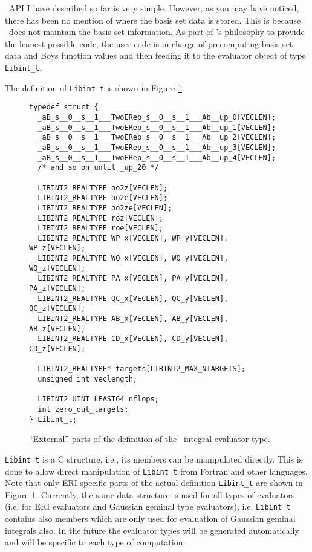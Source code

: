 \documentclass[12pt]{article}
\begin{document}
\LIBINT\ API I have described so far is very simple. However, as you may have noticed, there has been no mention of
where the basis set data is stored. This is because \LIBINT\ does not maintain the basis set information.
As part of \LIBINT 's philosophy to provide the leanest possible code, the user code
is in charge of precomputing basis set data and Boys function values and then feeding it to the evaluator object
of type {\tt Libint\_t}.

The definition of {\tt Libint\_t} is shown in Figure \ref{fig:libintt}.
\begin{figure}
\caption{\label{fig:libintt} ``External'' parts of the definition of the \LIBINT\ integral evaluator type. }
\begin{center}
\begin{minipage}[t]{0.9\linewidth}
\begin{verbatim}
typedef struct {
  _aB_s__0__s__1___TwoERep_s__0__s__1___Ab__up_0[VECLEN];
  _aB_s__0__s__1___TwoERep_s__0__s__1___Ab__up_1[VECLEN];
  _aB_s__0__s__1___TwoERep_s__0__s__1___Ab__up_2[VECLEN];
  _aB_s__0__s__1___TwoERep_s__0__s__1___Ab__up_3[VECLEN];
  _aB_s__0__s__1___TwoERep_s__0__s__1___Ab__up_4[VECLEN];
  /* and so on until _up_20 */

  LIBINT2_REALTYPE oo2z[VECLEN];
  LIBINT2_REALTYPE oo2e[VECLEN];
  LIBINT2_REALTYPE oo2ze[VECLEN];
  LIBINT2_REALTYPE roz[VECLEN];
  LIBINT2_REALTYPE roe[VECLEN];
  LIBINT2_REALTYPE WP_x[VECLEN], WP_y[VECLEN], WP_z[VECLEN];
  LIBINT2_REALTYPE WQ_x[VECLEN], WQ_y[VECLEN], WQ_z[VECLEN];
  LIBINT2_REALTYPE PA_x[VECLEN], PA_y[VECLEN], PA_z[VECLEN];
  LIBINT2_REALTYPE QC_x[VECLEN], QC_y[VECLEN], QC_z[VECLEN];
  LIBINT2_REALTYPE AB_x[VECLEN], AB_y[VECLEN], AB_z[VECLEN];
  LIBINT2_REALTYPE CD_x[VECLEN], CD_y[VECLEN], CD_z[VECLEN];
  
  LIBINT2_REALTYPE* targets[LIBINT2_MAX_NTARGETS];
  unsigned int veclength;

  LIBINT2_UINT_LEAST64 nflops;
  int zero_out_targets;
} Libint_t;
\end{verbatim}
\end{minipage}
\end{center}
\end{figure}
{\tt Libint\_t} is a C structure, i.e., its members can be manipulated directly.
This is done to allow direct manipulation of {\tt Libint\_t} from
Fortran and other languages.
Note that only ERI-specific parts of the actual definition {\tt Libint\_t} are shown in Figure \ref{fig:libintt}.
Currently, the same data structure is used for all types of evaluators (i.e. for ERI evaluators
and Gaussian geminal type evaluators), i.e. {\tt Libint\_t} contains also members which are only used
for evaluation of Gaussian geminal integrals also. In the future the evaluator types will be generated
automatically and will be specific to each type of computation.
\end{document}
